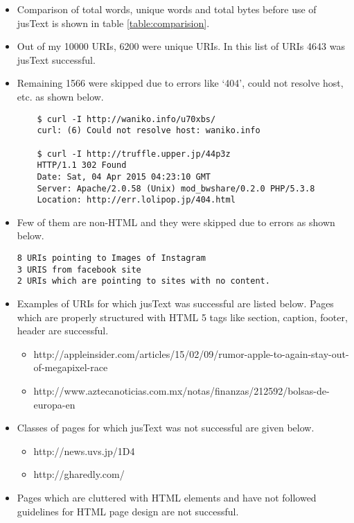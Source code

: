 \begin{itemize}
\item Comparison of total words, unique words and total bytes before use of jusText is shown in table \ref{table:comparision}.
\item Out of my 10000 URIs, 6200 were unique URIs. In this list of URIs 4643 was jusText successful.
\item Remaining 1566 were skipped due to errors like `404', could not resolve host, etc. as shown below.

\begin{verbatim}
	$ curl -I http://waniko.info/u70xbs/
	curl: (6) Could not resolve host: waniko.info
	
	$ curl -I http://truffle.upper.jp/44p3z
	HTTP/1.1 302 Found
	Date: Sat, 04 Apr 2015 04:23:10 GMT
	Server: Apache/2.0.58 (Unix) mod_bwshare/0.2.0 PHP/5.3.8
	Location: http://err.lolipop.jp/404.html
\end{verbatim}

\item Few of them are non-HTML and they were skipped due to errors as shown below.
\begin{verbatim}
8 URIs pointing to Images of Instagram
3 URIS from facebook site
2 URIs which are pointing to sites with no content.
\end{verbatim}

\item Examples of URIs for which jusText was successful are listed below. Pages which are properly structured with HTML 5 tags like section, caption, footer, header are successful.

\begin{itemize}
\item http://appleinsider.com/articles/15/02/09/rumor-apple-to-again-stay-out-of-megapixel-race
\item http://www.aztecanoticias.com.mx/notas/finanzas/212592/bolsas-de-europa-en
\end{itemize}
\end{itemize}


\begin{itemize}
\item Classes of pages for which jusText was not successful are given below.

\begin{itemize}
\item http://news.uvs.jp/1D4
\item http://gharedly.com/
\end{itemize}


\item Pages which are cluttered with HTML elements and have not followed guidelines for HTML page design are not successful.
\end{itemize}
\newpage
